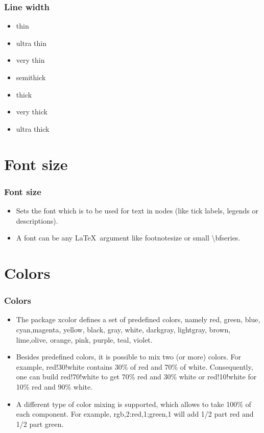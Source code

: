 \documentclass{beamer}
\begin{document}
\begin{frame}[fragile]
\frametitle{Line width}
\begin{itemize}
\item thin
\item ultra thin
\item very thin
\item semithick
\item thick
\item very thick
\item ultra thick
\end{itemize}
\end{frame}
\section{Font size}
\begin{frame}[fragile]
\frametitle{Font size}
\begin{itemize}
\item Sets the font which is to be used for text in nodes (like tick labels, legends or descriptions).
\item A font can be any \LaTeX\ argument like \color{blue} footnotesize \color{black} or \color{blue} small \textbackslash bfseries.
\end{itemize}
\end{frame}
\section{Colors}
\begin{frame}[fragile]
\frametitle{Colors}
\begin{itemize}
\item The package xcolor defines a set of predefined colors, namely red, green, blue, cyan,magenta, yellow, black, gray, white, darkgray, lightgray, brown, lime,olive, orange, pink, purple, teal, violet.
\item Besides predefined colors, it is possible to mix two (or more) colors. For example, red!30!white contains 30\% of red and 70\% of white. Consequently, one can build red!70!white to get 70\% red and 30\% white or red!10!white for 10\% red and 90\% white.
\item A different type of color mixing is supported, which allows to take 100\% of each component. For example, rgb,2:red,1;green,1 will add 1/2 part red and 1/2 part green.
\end{itemize}
\end{frame}
\end{document}
